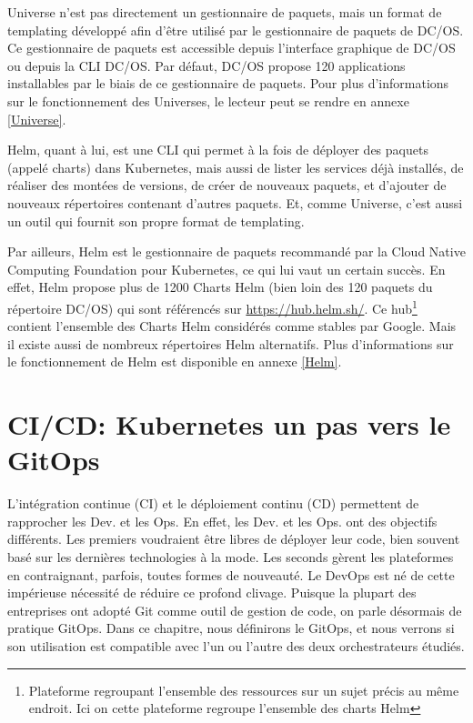 \documentclass[11pt,fleqn]{book} %
\begin{document}
Universe n'est pas directement un gestionnaire de paquets, mais un format de templating développé afin d'être utilisé par le gestionnaire de paquets de DC/OS. Ce gestionnaire de paquets est accessible depuis l'interface graphique de DC/OS ou depuis la CLI DC/OS. Par défaut, DC/OS propose 120 applications installables par le biais de ce gestionnaire de paquets. Pour plus d'informations sur le fonctionnement des Universes, le lecteur peut se rendre en annexe \ref{Universe}. \newline 

Helm, quant à lui, est une CLI qui permet à la fois de déployer des paquets (appelé charts) dans Kubernetes, mais aussi de lister les services déjà installés, de réaliser des montées de versions, de créer de nouveaux paquets, et d'ajouter de nouveaux répertoires contenant d'autres paquets. Et, comme Universe, c'est aussi un outil qui fournit son propre format de templating.\newline

Par ailleurs, Helm est le gestionnaire de paquets recommandé par la Cloud Native Computing Foundation pour Kubernetes, ce qui lui vaut un certain succès. En effet, Helm propose plus de 1200 Charts Helm (bien loin des 120 paquets du répertoire DC/OS) qui sont référencés sur \url{https://hub.helm.sh/}. Ce hub\footnote{Plateforme regroupant l'ensemble des ressources sur un sujet précis au même endroit. Ici on cette plateforme regroupe l'ensemble des charts Helm} contient l'ensemble des Charts Helm considérés comme stables par Google. Mais il existe aussi de nombreux répertoires Helm alternatifs. Plus d'informations sur le fonctionnement de Helm est disponible en annexe \ref{Helm}.\newline








\chapter{CI/CD: Kubernetes un pas vers le GitOps}
\vspace{-2cm}
L'intégration continue (CI) et le déploiement continu (CD) permettent de rapprocher les Dev. et les Ops. En effet, les Dev. et les Ops. ont des objectifs différents. Les premiers voudraient être libres de déployer leur code, bien souvent basé sur les dernières technologies à la mode. Les seconds gèrent les plateformes en contraignant, parfois, toutes formes de nouveauté. Le DevOps est né de cette impérieuse nécessité de réduire ce profond clivage. Puisque la plupart des entreprises ont adopté Git comme outil de gestion de code, on parle désormais de pratique GitOps. Dans ce chapitre, nous définirons le GitOps, et nous verrons si son utilisation est compatible avec l'un ou l'autre des deux orchestrateurs étudiés.
\end{document}
